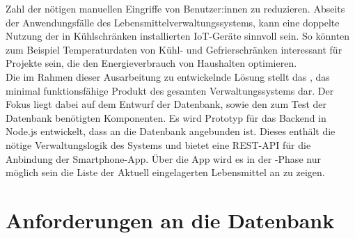 Zahl der nötigen manuellen Eingriffe von Benutzer:innen zu reduzieren. Abseits der Anwendungsfälle des Lebensmittelverwaltungssystems, kann eine doppelte Nutzung der in Kühlschränken installierten IoT-Geräte sinnvoll sein. So könnten zum Beispiel Temperaturdaten von Kühl- und Gefrierschränken interessant für Projekte sein, die den Energieverbrauch von Haushalten optimieren.\\ Die im Rahmen dieser Ausarbeitung zu entwickelnde Lösung stellt das , das minimal funktionsfähige Produkt des gesamten Verwaltungssystems dar. Der Fokus liegt dabei auf dem Entwurf der Datenbank, sowie den zum Test der Datenbank benötigten Komponenten. Es wird Prototyp für das \gls{Backend} in Node.js entwickelt, dass an die Datenbank angebunden ist. Dieses enthält die nötige Verwaltungslogik des Systems und bietet eine \gls{REST-API} für die Anbindung der Smartphone-App. Über die App wird es in der -Phase nur möglich sein die Liste der Aktuell eingelagerten Lebensmittel an zu zeigen.

\section{Anforderungen an die Datenbank}\label{sec:Anforderungen an die Datenbank}

